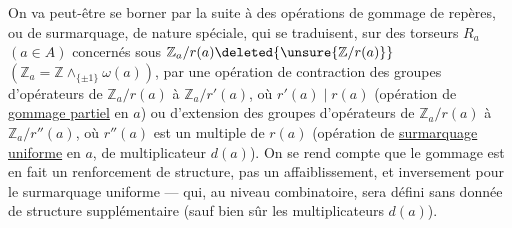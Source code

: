 On va peut-être se borner par la suite à des opérations de gommage de repères, ou de surmarquage, de nature spéciale, qui se traduisent, sur  des torseurs $R_a$ $(a\in A)$ concernés sous
$\mathbb Z_a/r(a)\deleted{\unsure{\mathbb Z/r(a)}}$
$(\mathbb Z_a=\mathbb Z\mathbin{\wedge}_{\{\pm1\}}\omega(a))$,
par une opération de contraction des groupes d'opérateurs de $\mathbb Z_a/r(a)$ à $\mathbb Z_a/r'(a)$, où $r'(a)\mid r(a)$
(opération de \uline{gommage partiel}  en $a$)
ou d'extension des groupes d'opérateurs de $\mathbb Z_a/r(a)$ à $\mathbb Z_a/r''(a)$, où $r''(a)$  est un multiple de $r(a)$
(opération de \uline{surmarquage uniforme} en $a$, \deleted{)} de multiplicateur $d(a)$).
On se rend compte  que le gommage  est en fait un renforcement de structure, pas un affaiblissement, et inversement pour le surmarquage uniforme --- qui, au niveau combinatoire, sera défini sans donnée de structure supplémentaire (sauf bien sûr les multiplicateurs $d(a)$).
